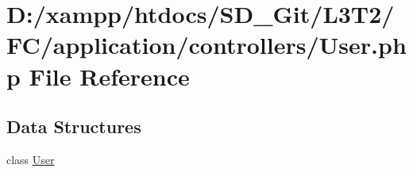 \hypertarget{_user_8php}{}\section{D\+:/xampp/htdocs/\+S\+D\+\_\+\+Git/\+L3\+T2/\+F\+C/application/controllers/\+User.php File Reference}
\label{_user_8php}
\subsection*{Data Structures}
\begin{DoxyCompactItemize}
\item 
class \hyperlink{class_user}{User}
\end{DoxyCompactItemize}
